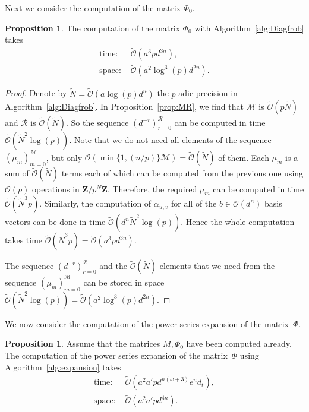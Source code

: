 \documentclass[a4paper,11pt]{article}
\numberwithin{equation}{section}
\newcommand{\ZZ}{\mathbf{Z}} %
\providecommand{\BigOh}{\mathcal{O}}          %
\providecommand{\SoftOh}{\tilde{\mathcal{O}}} %
\theoremstyle{definition}
\newtheorem{prop}[thm]{Proposition}
\begin{document}
Next we consider the computation of the matrix $\Phi_0$. 
\begin{prop}
The computation of the matrix $\Phi_0$ with Algorithm~\ref{alg:Diagfrob} takes
\begin{align*}
\mbox{time: }  &\SoftOh(a^3 p d^{3n}), \\
\mbox{space: } &\SoftOh(a^2 \log^3(p) d^{2n}).
\end{align*}
\end{prop}

\begin{proof}
Denote by $\tilde{N} = \SoftOh(a \log(p) d^n)$ the $p$-adic precision in 
Algorithm~\ref{alg:Diagfrob}.  In Proposition~\ref{prop:MR}, we find that 
$\mathcal{M}$ is $\SoftOh(p \tilde{N})$ and $\mathcal{R}$ is 
$\SoftOh(\tilde{N})$.  So the sequence $(d^{-r})_{r=0}^{\mathcal{R}}$ can 
be computed in time $\SoftOh(\tilde{N}^2 \log(p))$.  Note that we do not 
need all elements of the sequence $( \mu_{m} )_{m=0}^{\mathcal{M}}$, but only 
$\BigOh( \min \{ 1,(n/p) \} \mathcal{M} ) = \SoftOh(\tilde{N})$ of them. 
Each $\mu_m$ is a sum of $\SoftOh(\tilde{N})$ terms each of which can be 
computed from the previous one using $\BigOh(p)$ operations in 
$\ZZ/p^{\tilde{N}}\ZZ$.  Therefore, the required $\mu_m$ can be computed 
in time $\SoftOh(\tilde{N}^3 p)$.  Similarly, the computation of 
$\alpha_{u,v}$ for all of the $b \in \BigOh(d^n)$ basis vectors can be done 
in time $\SoftOh(d^n \tilde{N}^2 \log(p))$.  Hence the whole computation 
takes time $\SoftOh(\tilde{N}^3p) = \SoftOh(a^3 p d^{3n})$.

The sequence $(d^{-r})_{r=0}^{\mathcal{R}}$ and the $\SoftOh(\tilde{N})$ 
elements that we need from the sequence $( \mu_{m} )_{m=0}^{\mathcal{M}}$ 
can be stored in space $\SoftOh(\tilde{N}^2 \log(p)) = \SoftOh(a^2 \log^3(p) d^{2n})$.
\end{proof}

We now consider the computation of the power series expansion of the 
matrix~$\Phi$.

\begin{prop}
Assume that the matrices $M, \Phi_0$ have been computed already. 
The computation of the power series expansion of the matrix~$\Phi$ 
using Algorithm~\ref{alg:expansion} takes
\begin{align*}
\mbox{time: }  &\SoftOh(a^2 a' p d^{n(\omega+3)}e^n d_t), \\
\mbox{space: } &\SoftOh(a^2 a' p d^{4n}).
\end{align*}
\end{prop}
\end{document}
